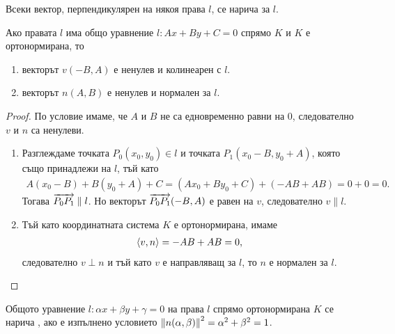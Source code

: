 \documentclass[numbers=endperiod, bibliography=totocnumbered]{scrartcl}
\begin{document}
\begin{definition}
  Всеки вектор, перпендикулярен на някоя права \( l \), се нарича  за \( l \).
\end{definition}

\begin{proposition}
  Ако правата \( l \) има общо уравнение \( l: Ax + By + C = 0 \) спрямо \( K \) и \( K \) е ортонормирана, то
  \begin{enumerate}
    \item векторът \( v(-B, A) \) е ненулев и колинеарен с \( l \).
    \item векторът \( n(A, B) \) е ненулев и нормален за \( l \).
  \end{enumerate}
\end{proposition}
\begin{proof}
  По условие имаме, че \( A \) и \( B \) не са едновременно равни на \( 0 \), следователно \( v \) и \( n \) са ненулеви.
  \begin{enumerate}
    \item Разглеждаме точката \( P_0(x_0, y_0) \in l \) и точката \( P_1(x_0 - B, y_0 + A) \), която също принадлежи на \( l \), тъй като
    \begin{align*}
      A(x_0 - B) + B(y_0 + A) + C = (Ax_0 + By_0 + C) + (-AB + AB) = 0 + 0 = 0.
    \end{align*}
     Тогава \( \overrightarrow{P_0 P_1} \parallel l \). Но векторът \( \overrightarrow{P_0 P_1}(-B, A) \) е равен на \( v \), следователно \( v \parallel l \).

    \item Тъй като координатната система \( K \) е ортонормирана, имаме
    \begin{align*}
      \left\langle v, n \right\rangle = -AB + AB = 0,
    \end{align*}
    следователно \( v \perp n \) и тъй като \( v \) е направляващ за \( l \), то \( n \) е нормален за \( l \).
  \end{enumerate}
\end{proof}

\begin{definition}
  Общото уравнение \( l: \alpha x + \beta y + \gamma = 0 \) на права \( l \) спрямо ортонормирана \( K \) се нарича , ако е изпълнено условието \( \left\Vert n(\alpha, \beta) \right\Vert^2 = \alpha^2 + \beta^2 = 1 \).
\end{definition}
\end{document}
